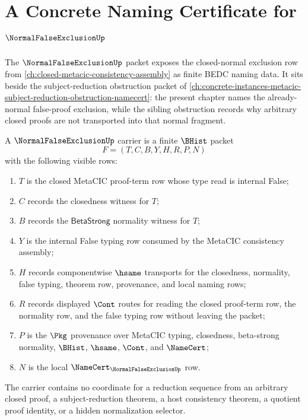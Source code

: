 \chapter{A Concrete Naming Certificate for $\NormalFalseExclusionUp$}
\label{ch:concrete-instances-normalfalseexclusion-namecert}

The $\NormalFalseExclusionUp$ packet exposes the closed-normal exclusion row from \autoref{ch:closed-metacic-consistency-assembly} as finite BEDC naming data. It sits beside the subject-reduction obstruction packet of \autoref{ch:concrete-instances-metacic-subject-reduction-obstruction-namecert}: the present chapter names the already-normal false-proof exclusion, while the sibling obstruction records why arbitrary closed proofs are not transported into that normal fragment.

\begin{definition}
\label{def:normal-false-exclusion-carrier}
A $\NormalFalseExclusionUp$ carrier is a finite $\BHist$ packet
$$
F=(T,C,B,Y,H,R,P,N)
$$
with the following visible rows:
\begin{enumerate}
\item $T$ is the closed MetaCIC proof-term row whose type read is internal False;
\item $C$ records the closedness witness for $T$;
\item $B$ records the $\mathsf{BetaStrong}$ normality witness for $T$;
\item $Y$ is the internal False typing row consumed by the MetaCIC consistency assembly;
\item $H$ records componentwise $\hsame$ transports for the closedness, normality, false typing, theorem row, provenance, and local naming rows;
\item $R$ records displayed $\Cont$ routes for reading the closed proof-term row, the normality row, and the false typing row without leaving the packet;
\item $P$ is the $\Pkg$ provenance over MetaCIC typing, closedness, beta-strong normality, $\BHist$, $\hsame$, $\Cont$, and $\NameCert$;
\item $N$ is the local $\NameCert_{\NormalFalseExclusionUp}$ row.
\end{enumerate}
The carrier contains no coordinate for a reduction sequence from an arbitrary closed proof, a subject-reduction theorem, a host consistency theorem, a quotient proof identity, or a hidden normalization selector.
\end{definition}

